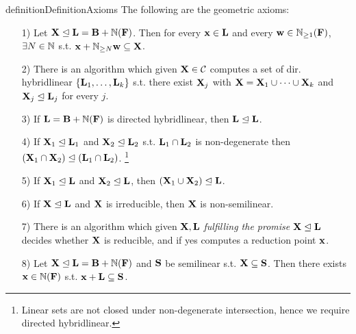 \begin{restatable}{definition}{DefinitionAxioms} The following are the geometric axioms:
\begin{enumerate}
\item[1)] Let \(\mathbf{X} \trianglelefteq \mathbf{L}=\mathbf{B}+\mathbb{N}(\mathbf{F})\). Then for every \(\mathbf{x} \in \mathbf{L}\) and every \(\mathbf{w} \in \mathbb{N}_{\geq 1}(\mathbf{F})\), \(\exists N \in \mathbb{N}\) s.t. \(\mathbf{x}+\mathbb{N}_{\geq N}\mathbf{w} \subseteq \mathbf{X}\). 
\item[2)] There is an algorithm which given \(\mathbf{X}\in \mathcal{C}\) computes a set of dir. hybridlinear \(\{\mathbf{L}_1, \dots, \mathbf{L}_k\}\) s.t. there exist \(\mathbf{X}_j\) with \(\mathbf{X}=\mathbf{X}_1 \cup \dots \cup \mathbf{X}_k\) and \(\mathbf{X}_j \trianglelefteq \mathbf{L}_j\) for every \(j\).
\item[3)] If \(\mathbf{L}=\mathbf{B}+\mathbb{N}(\mathbf{F})\) is directed hybridlinear, then \(\mathbf{L} \trianglelefteq \mathbf{L}\).
\item[4)] If \(\mathbf{X}_1 \trianglelefteq \mathbf{L}_1\) and \(\mathbf{X}_2 \trianglelefteq \mathbf{L}_2\) s.t. \(\mathbf{L}_1 \cap \mathbf{L}_2\) is non-degenerate then \((\mathbf{X}_1 \cap \mathbf{X}_2) \trianglelefteq (\mathbf{L}_1 \cap \mathbf{L}_2)\). \footnote{Linear sets are not closed under non-degenerate intersection, hence we require directed hybridlinear.}
\item[5)] If \(\mathbf{X}_1 \trianglelefteq \mathbf{L}\) and \(\mathbf{X}_2 \trianglelefteq \mathbf{L}\), then \((\mathbf{X}_1 \cup \mathbf{X}_2) \trianglelefteq \mathbf{L}\).
\item[6)] If \(\mathbf{X} \trianglelefteq \mathbf{L}\) and \(\mathbf{X}\) is irreducible, then \(\mathbf{X}\) is non-semilinear.
\item[7)] There is an algorithm which given \(\mathbf{X}, \mathbf{L}\) \emph{fulfilling the promise} \(\mathbf{X} \trianglelefteq \mathbf{L}\) decides whether \(\mathbf{X}\) is reducible, and if yes computes a reduction point \(\mathbf{x}\).
\item[8)] Let \(\mathbf{X} \trianglelefteq \mathbf{L}=\mathbf{B}+\mathbb{N}(\mathbf{F})\) and \(\mathbf{S}\) be semilinear s.t. \(\mathbf{X} \subseteq \mathbf{S}\). Then there exists \(\mathbf{x}\in \mathbb{N}(\mathbf{F})\) s.t. \(\mathbf{x}+\mathbf{L} \subseteq \mathbf{S}\).

\end{enumerate}
\end{restatable}
